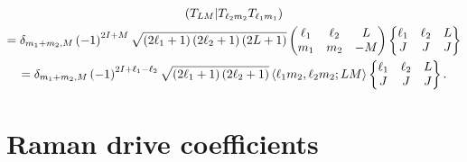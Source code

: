 \documentclass[nofootinbib,notitlepage,11pt]{revtex4-2}
\newcommand{\p}[1]{\left(#1\right)} %
\newcommand{\bk}{\Braket} %
\newcommand{\1}{\mathds{1}}
\def\obk#1{\mathinner{({#1})}}
\begin{document}
\begin{multline}
  \obk{T_{LM} | T_{\ell_2 m_2} T_{\ell_1 m_1}} \\
  = \delta_{m_1+m_2,M} \p{-1}^{2I+M}
  \sqrt{\p{2\ell_1+1}\p{2\ell_2+1}\p{2L+1}}
  \begin{pmatrix}
    \ell_1 & \ell_2 & L \\
    m_1 & m_2 & -M
  \end{pmatrix}
  \begin{Bmatrix}
    \ell_1 & \ell_2 & L \\
    J & J & J
  \end{Bmatrix} \\
  = \delta_{m_1+m_2,M} \p{-1}^{2I+\ell_1-\ell_2}
  \sqrt{\p{2\ell_1+1}\p{2\ell_2+1}}
  \bk{\ell_1 m_2, \ell_2 m_2; LM}
  \begin{Bmatrix}
    \ell_1 & \ell_2 & L \\
    J & J & J
  \end{Bmatrix}.
\end{multline}

\section{Raman drive coefficients}
\label{sec:drive_raman_coeff}
\end{document}
